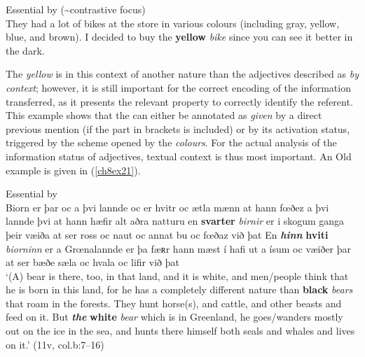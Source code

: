 \documentclass[output=paper,colorlinks,citecolor=brown]{langscibook}
\begin{document}
\begin{exe}
\ex\label{ch8ex20}Essential by  (\textasciitilde contrastive focus)\\
They had a lot of bikes at the store in various colours (including gray, yellow, blue, and brown). I decided to buy the \textbf{yellow} \textit{bike} since you can see it better in the dark.
\end{exe}

The  \emph{yellow} is in this context of another nature than
the adjectives described as \emph{ by context}; however, it is
still important for the correct encoding of the information transferred,
as it presents the relevant property to correctly identify the referent.
This example shows that the  can either be annotated as
\emph{given} by a direct previous mention (if the part in brackets is
included) or by its activation status, triggered by the scheme opened by
the  \emph{colours}. For the actual analysis of the information
status of adjectives, textual context is thus most important. An Old
 example is given in (\ref{ch8ex21}).

\begin{exe}
\ex\label{ch8ex21}Essential by \\
Biorn er þar oc a þvi lannde oc er hvitr oc ætla mænn at hann fœðez a
þvi lannde þvi at hann hæfir alt aðra natturu en \textbf{svarter}
\textit{birnir} er i skogum ganga þeir væiða at ser ross oc naut oc annat bu oc
fœðaz við þat En \textbf{\textit{hinn}} \textbf{hviti} \textit{biorninn} er a Grœnalannde er þa
fæʀr hann mæst í hafi ut a ísum oc væiðer þar at ser bæðe sæla oc hvala
oc lifir við þat \\

\noindent `(A) bear is there, too, in that land, and it is white, and men/people
think that he is born in this land, for he has a completely different
nature than \textbf{black} \textit{bears} that roam in the forests. They hunt
horse(s), and cattle, and other beasts and feed on it. But \textit{\textbf{the}}
\textbf{white} \textit{bear} which is in Greenland, he goes/wanders mostly out
on the ice in the sea, and hunts there himself both seals and whales and
lives on it.' (11v, col.b:7--16)
\end{exe}
\end{document}
